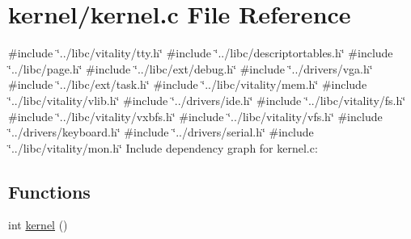 \hypertarget{a00068}{}\section{kernel/kernel.c File Reference}
\label{a00068}
{\ttfamily \#include \char`\"{}../libc/vitality/tty.\+h\char`\"{}}\newline
{\ttfamily \#include \char`\"{}../libc/descriptortables.\+h\char`\"{}}\newline
{\ttfamily \#include \char`\"{}../libc/page.\+h\char`\"{}}\newline
{\ttfamily \#include \char`\"{}../libc/ext/debug.\+h\char`\"{}}\newline
{\ttfamily \#include \char`\"{}../drivers/vga.\+h\char`\"{}}\newline
{\ttfamily \#include \char`\"{}../libc/ext/task.\+h\char`\"{}}\newline
{\ttfamily \#include \char`\"{}../libc/vitality/mem.\+h\char`\"{}}\newline
{\ttfamily \#include \char`\"{}../libc/vitality/vlib.\+h\char`\"{}}\newline
{\ttfamily \#include \char`\"{}../drivers/ide.\+h\char`\"{}}\newline
{\ttfamily \#include \char`\"{}../libc/vitality/fs.\+h\char`\"{}}\newline
{\ttfamily \#include \char`\"{}../libc/vitality/vxbfs.\+h\char`\"{}}\newline
{\ttfamily \#include \char`\"{}../libc/vitality/vfs.\+h\char`\"{}}\newline
{\ttfamily \#include \char`\"{}../drivers/keyboard.\+h\char`\"{}}\newline
{\ttfamily \#include \char`\"{}../drivers/serial.\+h\char`\"{}}\newline
{\ttfamily \#include \char`\"{}../libc/vitality/mon.\+h\char`\"{}}\newline
Include dependency graph for kernel.\+c\+:
\subsection*{Functions}
\begin{DoxyCompactItemize}
\item 
int \hyperlink{a00068_a4ee3d1f05046b7afc6b4d516bf10667a_a4ee3d1f05046b7afc6b4d516bf10667a}{kernel} ()
\end{DoxyCompactItemize}
